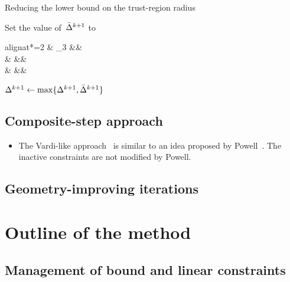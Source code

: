 \begin{algorithm}
    \caption{Reducing the lower bound on the trust-region radius}
    \label{alg:reducing-lower-bound-trust-region-radius}
    \DontPrintSemicolon
    Set the value of~$\radlb[k + 1]$ to
    \begin{algoempheq}[left={\radlb[k + 1] \gets \empheqlbrace}]{alignat*=2}
        & \theta_3 \radlb[k]                && \quad {}\\
        & \sqrt{\radlb[k] \radlb[\infty]}   && \quad {}\\
        & \radlb[\infty]                    && \quad {}
    \end{algoempheq}
    $\rad[k + 1] \gets \max \set{\rad[k + 1], \radlb[k + 1]}$\;
\end{algorithm}

\subsection{Composite-step approach}

\begin{itemize}
    \item The Vardi-like approach~\cite{Vardi_1985} is similar to an idea proposed by Powell~\cite[Eqs.~(2.7) and~(2.8)]{Powell_1978a}.
    The inactive constraints are not modified by Powell.
\end{itemize}

\subsection{Geometry-improving iterations}
\label{subsec:geometry-improving-iterations}

\section{Outline of the  method}

\subsection{Management of bound and linear constraints}
\label{subsec:bound-constraints}

